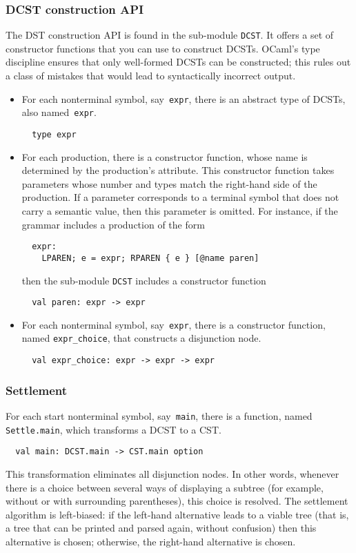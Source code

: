 \subsubsection{DCST construction API}

The DST construction API is found in the sub-module \texttt{DCST}. It offers a
set of constructor functions that you can use to construct DCSTs. OCaml's type
discipline ensures that only well-formed DCSTs can be constructed; this rules
out a class of mistakes that would lead to syntactically incorrect output.

\begin{itemize}
\item
For each nonterminal symbol, say~\texttt{expr},
there is an abstract type of DCSTs, also named~\texttt{expr}.
\begin{verbatim}
  type expr
\end{verbatim}
%
\item
For each production,
there is a constructor function,
whose name is determined by the production's \atname attribute.
%
This constructor function
  takes parameters %
  whose number and types
  match the right-hand side of the production.
%
If a parameter corresponds to a terminal symbol
  that does not carry a semantic value,
  then this parameter is omitted.
%
For instance, if the grammar includes a production of the form
\begin{verbatim}
  expr:
    LPAREN; e = expr; RPAREN { e } [@name paren]
\end{verbatim}
then the sub-module \texttt{DCST} includes a constructor function
\begin{verbatim}
  val paren: expr -> expr
\end{verbatim}

\item
For each nonterminal symbol, say~\texttt{expr},
there is a constructor function,
named \texttt{expr\_choice},
that constructs a disjunction node.
\begin{verbatim}
  val expr_choice: expr -> expr -> expr
\end{verbatim}
\end{itemize}

\subsubsection{Settlement}

For each start nonterminal symbol, say~\texttt{main},
there is a function,
named \texttt{Settle.main},
which transforms a DCST to a CST.
%
\begin{verbatim}
  val main: DCST.main -> CST.main option
\end{verbatim}
%
This transformation eliminates all disjunction nodes. In other words, whenever
there is a choice between several ways of displaying a subtree (for example,
without or with surrounding parentheses), this choice is resolved. The
settlement algorithm is left-biased: if the left-hand alternative leads to a
viable tree (that is, a tree that can be printed and parsed again, without
confusion) then this alternative is chosen; otherwise, the right-hand
alternative is chosen.

